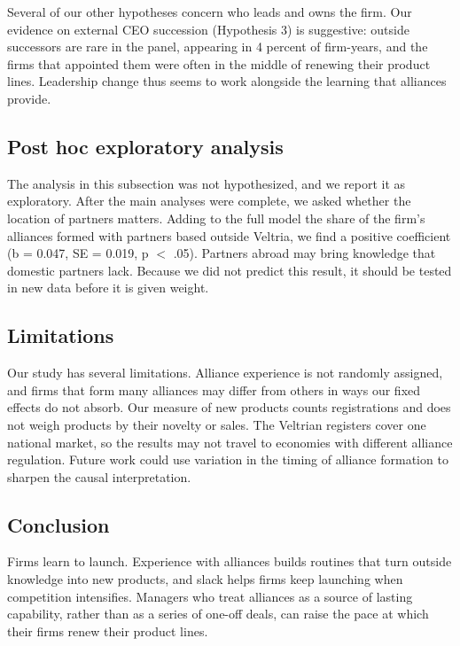 \documentclass[12pt]{article}
\begin{document}
Several of our other hypotheses concern who leads and owns the firm. Our evidence on external CEO succession (Hypothesis 3) is suggestive: outside successors are rare in the panel, appearing in 4 percent of firm-years, and the firms that appointed them were often in the middle of renewing their product lines. Leadership change thus seems to work alongside the learning that alliances provide.

\subsection{Post hoc exploratory analysis}

The analysis in this subsection was not hypothesized, and we report it as exploratory. After the main analyses were complete, we asked whether the location of partners matters. Adding to the full model the share of the firm's alliances formed with partners based outside Veltria, we find a positive coefficient (b = 0.047, SE = 0.019, p $<$ .05). Partners abroad may bring knowledge that domestic partners lack. Because we did not predict this result, it should be tested in new data before it is given weight.

\subsection{Limitations}

Our study has several limitations. Alliance experience is not randomly assigned, and firms that form many alliances may differ from others in ways our fixed effects do not absorb. Our measure of new products counts registrations and does not weigh products by their novelty or sales. The Veltrian registers cover one national market, so the results may not travel to economies with different alliance regulation. Future work could use variation in the timing of alliance formation to sharpen the causal interpretation.

\subsection{Conclusion}

Firms learn to launch. Experience with alliances builds routines that turn outside knowledge into new products, and slack helps firms keep launching when competition intensifies. Managers who treat alliances as a source of lasting capability, rather than as a series of one-off deals, can raise the pace at which their firms renew their product lines.
\end{document}
